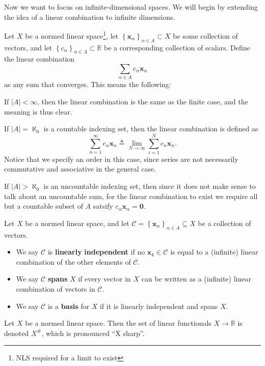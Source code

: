 \documentclass[11pt, letterpaper]{report}
\begin{document}
Now we want to focus on infinite-dimensional spaces. We will begin by extending the idea of a linear combination to infinite dimensions.
\begin{definition}\label{dfn:2.18}
	Let $X$ be a normed linear space\footnote{NLS required for a limit to exist}, let $\left\{ \mathbf{x}_\alpha  \right\}_{\alpha \in A}\subset X$ be some collection of vectors, and let $\left\{ c_\alpha  \right\}_{\alpha \in A}\subset \mathbb{R}$ be a corresponding collection of scalars. Define the linear combination
	\[
		\sum_{\alpha \in A}c_\alpha \mathbf{x}_\alpha  
	\]
	as any sum that converges. This means the following:

	If $\left| A \right| <\infty$, then the linear combination is the same as the finite case, and the meaning is thus clear.

	If $\left| A \right| =\aleph_0$ is a countable indexing set, then the linear combination is defined as
	\[
		\sum_{n=1}^{\infty} c_n \mathbf{x}_n \triangleq \lim_{N \to \infty} \sum_{i=1}^{N} c_n \mathbf{x}_n
	.\]
	Notice that we specify an order in this case, since series are not necessarily commutative and associative in the general case.

	If $\left| A \right| >\aleph_0$ is an uncountable indexing set, then since it does not make sense to talk about an uncountable sum, for the linear combination to exist we require all but a countable subset of $A$ satsify $c_\alpha \mathbf{x}_\alpha =\mathbf{0}$.
\end{definition}
\begin{definition}\label{dfn:2.19}
	Let $X$ be a normed linear space, and let $\mathcal{C} =\left\{ \mathbf{x}_\alpha  \right\}_{\alpha \in A}\subseteq X$ be a collection of vectors.
	\begin{itemize}
		\item We say $\mathcal{C} $ is \textbf{linearly} \textbf{independent} if no $\mathbf{x}_k\in \mathcal{C} $ is equal to a (infinite) linear combination of the other elements of $\mathcal{C} $.
		\item We say $\mathcal{C} $ \textbf{spans} $X$ if every vector in $X$ can be written as a (infinite) linear combination of vectors in $\mathcal{C} $.
		\item We say $\mathcal{C} $ is a \textbf{basis} for $X$ if it is linearly independent and spans $X$.
	\end{itemize}
\end{definition}
\begin{definition}\label{dfn:2.20}
	Let $X$ be a normed linear space. Then the set of linear functionals $X\to \mathbb{R}$ is denoted $X^\#$, which is pronounced ``X sharp''. 
\end{definition}
\end{document}
